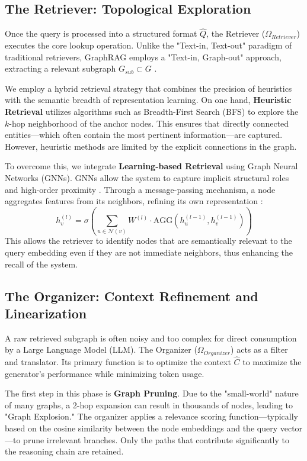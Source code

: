 \documentclass[a4paper, 12pt]{extreport}
\begin{document}
\subsection{The Retriever: Topological Exploration}
Once the query is processed into a structured format $\hat{Q}$, the Retriever ($\Omega_{Retriever}$) executes the core lookup operation. Unlike the "Text-in, Text-out" paradigm of traditional retrievers, GraphRAG employs a "Text-in, Graph-out" approach, extracting a relevant subgraph $G_{sub} \subset G$ .

We employ a hybrid retrieval strategy that combines the precision of heuristics with the semantic breadth of representation learning. On one hand, \textbf{Heuristic Retrieval} utilizes algorithms such as Breadth-First Search (BFS) to explore the $k$-hop neighborhood of the anchor nodes. This ensures that directly connected entities—which often contain the most pertinent information—are captured. However, heuristic methods are limited by the explicit connections in the graph.

To overcome this, we integrate \textbf{Learning-based Retrieval} using Graph Neural Networks (GNNs). GNNs allow the system to capture implicit structural roles and high-order proximity \cite{wu2023comprehensive}. Through a message-passing mechanism, a node aggregates features from its neighbors, refining its own representation \cite{scarselli2008gnn, kipf2017gcn}:
\begin{equation}
    h_v^{(l)} = \sigma \left( \sum_{u \in \mathcal{N}(v)} W^{(l)} \cdot \text{AGG}\left(h_u^{(l-1)}, h_v^{(l-1)}\right) \right)
\end{equation}
This allows the retriever to identify nodes that are semantically relevant to the query embedding even if they are not immediate neighbors, thus enhancing the recall of the system.



\subsection{The Organizer: Context Refinement and Linearization}
A raw retrieved subgraph is often noisy and too complex for direct consumption by a Large Language Model (LLM). The Organizer ($\Omega_{Organizer}$) acts as a filter and translator. Its primary function is to optimize the context $\hat{C}$ to maximize the generator's performance while minimizing token usage.

The first step in this phase is \textbf{Graph Pruning}. Due to the "small-world" nature of many graphs, a 2-hop expansion can result in thousands of nodes, leading to "Graph Explosion." The organizer applies a relevance scoring function—typically based on the cosine similarity between the node embeddings and the query vector—to prune irrelevant branches. Only the paths that contribute significantly to the reasoning chain are retained.
\end{document}
